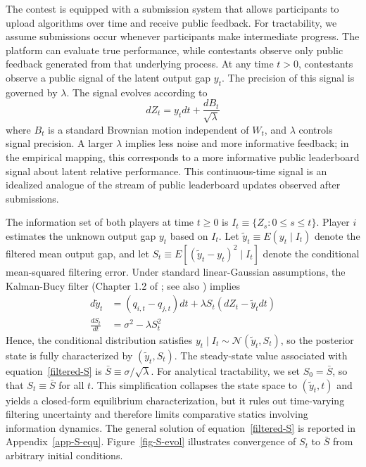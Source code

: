 \documentclass[mnsc]{informs3}
\begin{document}
The contest is equipped with a submission system that allows participants to upload algorithms over time and receive public feedback.
For tractability, we assume submissions occur whenever participants make intermediate progress.
The platform can evaluate true performance, while contestants observe only public feedback generated from that underlying process.
At any time $t>0$, contestants observe a public signal of the latent output gap $y_t$.
The precision of this signal is governed by $\lambda$.
The signal evolves according to
\begin{equation}\label{signal}
	dZ_{t} = y_{t}dt + \frac{dB_{t}}{\sqrt{\lambda}}
\end{equation}
where $B_{t}$ is a standard Brownian motion independent of $W_t$, and $\lambda$ controls signal precision.
A larger $\lambda$ implies less noise and more informative feedback; in the empirical mapping, this corresponds to a more informative public leaderboard signal about latent relative performance.
This continuous-time signal is an idealized analogue of the stream of public leaderboard updates observed after submissions.

The information set of both players at time $t \ge 0$ is $I_t \equiv \{Z_s : 0 \le s \le t\}$.
Player $i$ estimates the unknown output gap $y_t$ based on $I_t$.
Let $\tilde{y}_t \equiv E(y_t \mid I_t)$ denote the filtered mean output gap, and let
$S_t \equiv E[(\tilde{y}_t-y_t)^2 \mid I_t]$ denote the conditional mean-squared filtering error.
Under standard linear-Gaussian assumptions, the Kalman-Bucy filter (Chapter 1.2 of \citealt{Bensoussan1992Control}; see also \citealt{frogerais2012various,barrau2017invariant}) implies
\begin{align}
	d\tilde{y}_{t} &= (q_{i,t}-q_{j,t})dt + \lambda S_{t}(dZ_{t}-\tilde{y}_{t}dt)
	\label{filtered-x}\\
	\frac{dS_{t}}{dt} &= \sigma^2 - \lambda S_{t}^2
	\label{filtered-S}
\end{align}
Hence, the conditional distribution satisfies $y_t \mid I_t \sim \mathcal{N}(\tilde{y}_t,S_t)$, so the posterior state is fully characterized by $(\tilde y_t,S_t)$.
The steady-state value associated with equation~\eqref{filtered-S} is $\bar S \equiv \sigma/\sqrt{\lambda}$.
For analytical tractability, we set $S_0=\bar S$, so that $S_t \equiv \bar S$ for all $t$.
This simplification collapses the state space to $(\tilde y_t,t)$ and yields a closed-form equilibrium characterization, but it rules out time-varying filtering uncertainty and therefore limits comparative statics involving information dynamics.
The general solution of equation~\eqref{filtered-S} is reported in Appendix~\ref{app-S-equ}.
Figure~\ref{fig-S-evol} illustrates convergence of $S_t$ to $\bar S$ from arbitrary initial conditions.
\end{document}
